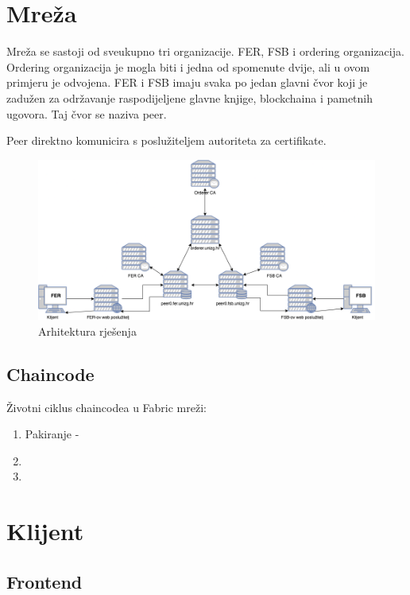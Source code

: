 \documentclass[times, utf8, diplomski]{fer}
\begin{document}
\section{Mreža}
Mreža se sastoji od sveukupno tri organizacije. FER, FSB i ordering organizacija. Ordering organizacija je mogla biti i jedna od spomenute dvije, ali u ovom primjeru je odvojena. FER i FSB imaju svaka po jedan glavni čvor koji je zadužen za održavanje raspodijeljene glavne knjige, blockchaina i pametnih ugovora. Taj čvor se naziva peer.

Peer direktno komunicira s poslužiteljem autoriteta za certifikate.

\begin{figure}[htb]
\centering
\includegraphics[width=12cm]{imgs/Arhitektura.png}
\caption{Arhitektura rješenja}
\label{fig:arhitektura}
\end{figure}

\subsection{Chaincode}

Životni ciklus chaincodea u Fabric mreži:

\begin{enumerate}
\item Pakiranje - 

\item

\item
\end{enumerate}

\section{Klijent}
\subsection{Frontend}
\end{document}
